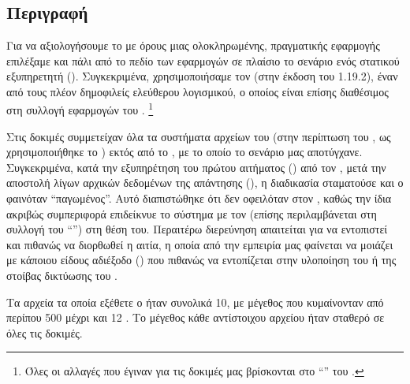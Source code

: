 \section{}
\subsection{Περιγραφή}
Για να αξιολογήσουμε το \viofs{} με όρους μιας ολοκληρωμένης, πραγματικής
εφαρμογής επιλέξαμε και πάλι από το πεδίο των  εφαρμογών σε
πλαίσιο  το σενάριο ενός στατικού  εξυπηρετητή ().
Συγκεκριμένα, χρησιμοποιήσαμε τον  \cite{nginx} (στην έκδοση του
1.19.2), έναν από τους πλέον δημοφιλείς  ελεύθερου λογισμικού, ο
οποίος είναι επίσης διαθέσιμος στη συλλογή εφαρμογών του \osv{}.%
\footnote{Όλες οι αλλαγές που έγιναν για τις δοκιμές μας βρίσκονται στο
``''  του .}

Στις δοκιμές συμμετείχαν όλα τα συστήματα αρχείων του \osv{} (στην περίπτωση
του \viofs{}, ως  χρησιμοποιήθηκε το )
εκτός από το , με το οποίο το σενάριο μας αποτύγχανε. Συγκεκριμένα, κατά
την εξυπηρέτηση του πρώτου αιτήματος () από τον , μετά
την αποστολή λίγων αρχικών δεδομένων της απάντησης (), η διαδικασία
σταματούσε και ο \guest{} φαινόταν ``παγωμένος''. Αυτό διαπιστώθηκε ότι δεν
οφειλόταν στον , καθώς την ίδια ακριβώς συμπεριφορά επιδείκνυε το
σύστημα με τον  (επίσης περιλαμβάνεται στη συλλογή του
``'') στη θέση του. Περαιτέρω διερεύνηση απαιτείται για να
εντοπιστεί και πιθανώς να διορθωθεί η αιτία, η οποία από την εμπειρία μας
φαίνεται να μοιάζει με κάποιου είδους αδιέξοδο () που πιθανώς να
εντοπίζεται στην υλοποίηση του  ή της στοίβας δικτύωσης του \osv{}.

Τα αρχεία τα οποία εξέθετε ο  ήταν συνολικά 10, με μέγεθος που
κυμαίνονταν από περίπου 500  μέχρι και 12 . Το μέγεθος κάθε
αντίστοιχου αρχείου ήταν σταθερό σε όλες τις δοκιμές.

